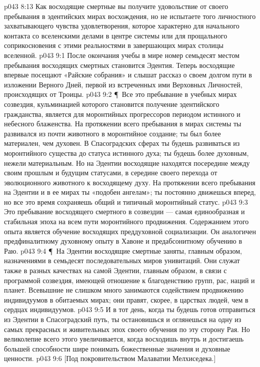 \vs p043 8:13 Как восходящие смертные вы получите удовольствие от своего пребывания в эдентийских мирах восхождения, но не испытаете того личностного захватывающего чувства удовлетворения, которое характерно для начального контакта со вселенскими делами в центре системы или для прощального соприкосновения с этими реальностями в завершающих мирах столицы вселенной.
\vs p043 9:1 После окончания учебы в мире номер семьдесят местом пребывания восходящих смертных становится Эдентия. Теперь восходящие впервые посещают «Райские собрания» и слышат рассказ о своем долгом пути в изложении Верного Дней, первой из встреченных ими Верховных Личностей, происходящих от Троицы.
\vs p043 9:2 \P\ Все это пребывание в учебных мирах созвездия, кульминацией которого становится получение эдентийского гражданства, является для моронтийных прогрессоров периодом истинного и небесного блаженства. На протяжении всего пребывания в мирах системы ты развивался из почти животного в моронтийное создание; ты был более материален, чем духовен. В Спасоградских сферах ты будешь развиваться из моронтийного существа до статуса истинного духа; ты будешь более духовным, нежели материальным. Но на Эдентии восходящие находятся посередине между своим прошлым и будущим статусами, в середине своего перехода от эволюционного животного к восходящему духу. На протяжении всего пребывания на Эдентии и в ее мирах ты «подобен ангелам»; ты постоянно движешься вперед, но все это время сохраняешь общий и типичный моронтийный статус.
\vs p043 9:3 Это пребывание восходящего смертного в созвездии --- самая единообразная и стабильная эпоха на всем пути моронтийного продвижения. Содержанием этого опыта является обучение восходящих преддуховной социализации. Он аналогичен предфиналитному духовному опыту в Хавоне и предабсонитному обучению в Раю.
\vs p043 9:4 \P\ На Эдентии восходящие смертные заняты, главным образом, назначениями в семьдесят последовательных миров унивитаций. Они служат также в разных качествах на самой Эдентии, главным образом, в связи с программой созвездия, имеющей отношение к благоденствию групп, рас, наций и планет. Всевышние не слишком много занимаются содействием продвижению индивидуумов в обитаемых мирах; они правят, скорее, в царствах людей, чем в сердцах индивидуумов.
\vs p043 9:5 И в тот день, когда ты будешь готов отправиться из Эдентии в Спасоградский путь, ты остановишься и оглянешься на одну из самых прекрасных и живительных эпох своего обучения по эту сторону Рая. Но великолепие всего этого увеличивается, когда восходишь внутрь и достигаешь большей способности шире понимать божественные значения и духовные ценности.
\vs p043 9:6 [Под покровительством Малаватии Мелхиседека.]
